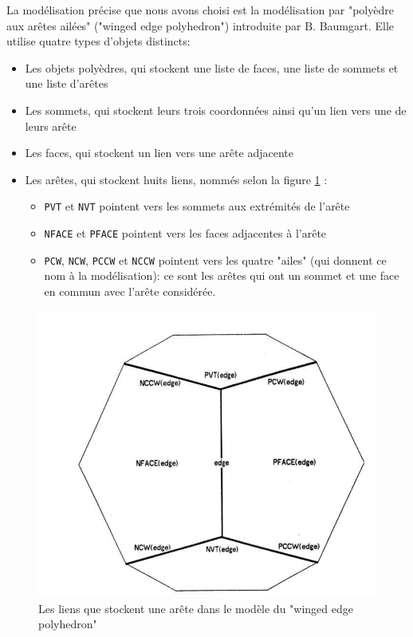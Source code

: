 \documentclass[a4paper]{article}
\begin{document}
      
      La modélisation précise que nous avons choisi est la modélisation par "polyèdre aux arêtes ailées" ("winged edge polyhedron") introduite par B. Baumgart. Elle utilise quatre types d'objets distincts:
      \begin{itemize}
        \item Les objets polyèdres, qui stockent une liste de faces, une liste de sommets et une liste d'arêtes
        \item Les sommets, qui stockent leurs trois coordonnées ainsi qu'un lien vers une de leurs arête
        \item Les faces, qui stockent un lien vers une arête adjacente
        \item Les arêtes, qui stockent huits liens, nommés selon la figure \ref{wep} :
        \begin{itemize}
          \item \texttt{PVT} et \texttt{NVT} pointent vers les sommets aux extrémités de l'arête
          \item \texttt{NFACE} et \texttt{PFACE} pointent vers les faces adjacentes à l'arête
          \item \texttt{PCW}, \texttt{NCW}, \texttt{PCCW} et \texttt{NCCW} pointent vers les quatre "ailes" (qui donnent ce nom à la modélisation): ce sont les arêtes qui ont un sommet et une face en commun avec l'arête considérée.
        \end{itemize}
      \end{itemize}

      \begin{figure}
        \includegraphics[width=0.5\linewidth]{WEP}
        \centering
        \caption{Les liens que stockent une arête dans le modèle du "winged edge polyhedron"}
        \label{wep}
      \end{figure}
\end{document}
